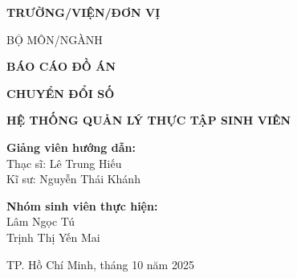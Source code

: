 \begin{titlepage}
    \centering
    
    {\Large\bfseries TRƯỜNG/VIỆN/ĐƠN VỊ}\par
    {\large BỘ MÔN/NGÀNH}\par

    \vspace{1cm}


    \vspace{1.5cm}

    {\Large\bfseries BÁO CÁO ĐỒ ÁN}\par
    {\large\bfseries CHUYỂN ĐỔI SỐ}\par

    \vspace{1.5cm}

    {\Huge\bfseries HỆ THỐNG QUẢN LÝ THỰC TẬP SINH VIÊN}\par

    \vspace{2cm}

    \begin{flushleft}
        \hspace{2.5cm}\textbf{Giảng viên hướng dẫn:}\\
        \hspace{3.5cm}Thạc sĩ: Lê Trung Hiếu\\
        \hspace{3.5cm}Kĩ sư: Nguyễn Thái Khánh\\
        
        \vspace{0.6cm}

        \hspace{2.5cm}\textbf{Nhóm sinh viên thực hiện:}\\
        \hspace{3.5cm}Lâm Ngọc Tú\\
        \hspace{3.5cm}Trịnh Thị Yến Mai\\
    \end{flushleft}

    \vfill

    {\large TP. Hồ Chí Minh, tháng 10 năm 2025}

\end{titlepage}
